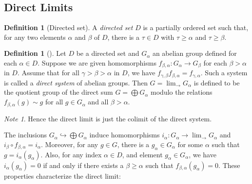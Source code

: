 \documentclass[reqno]{amsart}
\theoremstyle{definition}
\newtheorem{definition}[theorem]{Definition}
\theoremstyle{remark}
\newtheorem*{note}{Note}
\begin{document}
\subsection{Direct Limits}

\begin{definition}[Directed set]
    A \textit{directed set} $D$ is a partially ordered set such that,
    for any two elements $\alpha$ and $\beta$ of $D$, there
    is a $\tau \in D$ with $\tau \ge \alpha$  and
    $\tau \ge \beta$.
\end{definition}

\begin{definition}[]
    Let $D$ be a directed set and $G_{\alpha}$ an abelian group
    defined for each $\alpha \in D$. Suppose
    we are given homomorphisms
    $f_{\beta, \alpha} \colon G_{\alpha} \to G_{\beta}$ 
    for each $\beta > \alpha$ in $D$. Assume that for all
    $\gamma > \beta > \alpha$ in $D$, we have
    $f_{\gamma, \beta} f_{\beta, \alpha} = f_{\gamma, \alpha}$.
    Such a system is called a \textit{direct system} of abelian
    groups. Then $G = \lim_{\rightarrow} G_{\alpha}$ is defined
    to be the quotient group of the direct sum
    $G = \bigoplus G_{\alpha}$ modulo the relations
    $f_{\beta, \alpha}(g) \sim g$ for all $g \in G_\alpha$ and
    all $\beta > \alpha$.

    \begin{note}
        Hence the direct limit is just the colimit of the direct
        system.
    \end{note}
\end{definition}

The inclusions
$G_{\alpha} \hookrightarrow \bigoplus G_{\alpha}$ induce
homomorphisms
$i_{\alpha} \colon G_{\alpha} \to \lim_{\rightarrow}G_{\alpha}$ and
$i_{\beta} \circ f_{\beta, \alpha} = i_{\alpha}$. Moreover,
for any $g \in G$, there is a $g_{\alpha}\in G_{\alpha}$ for
some $\alpha$ such that $g = i_{\alpha} (g_{\alpha})$.
Also, for any index $\alpha \in D$, and element
$g_{\alpha} \in G_{\alpha}$, we have
$i_{\alpha}(g_{\alpha}) = 0$ if and only if
there exists a  $\beta \ge \alpha$ such that
$f_{\beta, \alpha}(g_{\alpha}) = 0$. These properties
characterize the direct limit:
\end{document}
